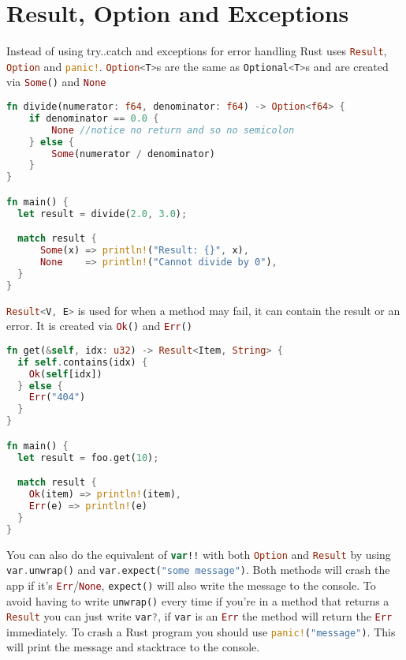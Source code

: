\documentclass[a4paper,11pt]{article}
\begin{document}
\renewcommand{\arraystretch}{1}

\newpage
\section{Result, Option and Exceptions}
Instead of using try..catch and exceptions for error handling Rust uses \lstinline[language=Rust]{Result}, \lstinline[language=Rust]{Option} and \lstinline[language=Rust]{panic!}.
\newline
\newline
\lstinline[language=Rust]{Option<T>}s are the same as \lstinline[language=Kotlin]{Optional<T>}s and are created via \lstinline[language=Rust]{Some()} and \lstinline[language=Rust]{None}
\begin{lstlisting}[language=Rust,frame=single]
fn divide(numerator: f64, denominator: f64) -> Option<f64> {
    if denominator == 0.0 {
        None //notice no return and so no semicolon
    } else {
        Some(numerator / denominator)
    }
}

fn main() {
  let result = divide(2.0, 3.0);

  match result {
      Some(x) => println!("Result: {}", x),
      None    => println!("Cannot divide by 0"),
  }
}
\end{lstlisting}

\lstinline[language=Rust]{Result<V, E>} is used for when a method may fail, it can contain the result or an error. It is created via \lstinline[language=Rust]{Ok()} and \lstinline[language=Rust]{Err()}

\begin{lstlisting}[language=Rust,frame=single]
fn get(&self, idx: u32) -> Result<Item, String> {
  if self.contains(idx) {
    Ok(self[idx])
  } else {
    Err("404")
  }
}

fn main() {
  let result = foo.get(10);

  match result {
    Ok(item) => println!(item),
    Err(e) => println!(e)
  }
}
\end{lstlisting}

You can also do the equivalent of \lstinline[language=Kotlin]{var!!} with both \lstinline[language=Rust]{Option} and \lstinline[language=Rust]{Result} by using \lstinline[language=Rust]{var.unwrap()} and \lstinline[language=Rust]{var.expect("some message")}. Both methods will crash the app if it's \lstinline[language=Rust]{Err}/\lstinline[language=Rust]{None}, \lstinline[language=Rust]{expect()} will also write the message to the console.
\newline
To avoid having to write \lstinline[language=Rust]{unwrap()} every time if you're in a method that returns a \lstinline[language=Rust]{Result} you can just write \lstinline[language=Rust]{var?}, if \lstinline{var} is an \lstinline[language=Rust]{Err} the method will return the \lstinline[language=Rust]{Err} immediately.
\newline
To crash a Rust program you should use \lstinline[language=Rust]{panic!("message")}. This will print the message and stacktrace to the console.
\end{document}
